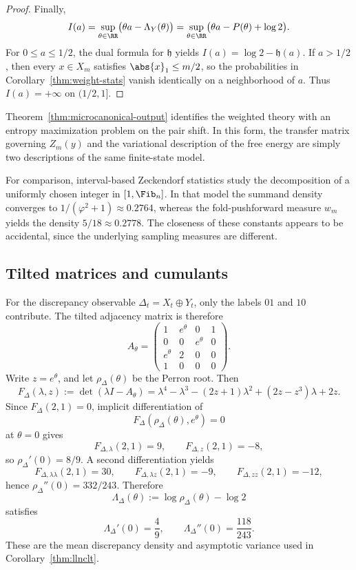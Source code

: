 \begin{proof}
Finally,
\[
I(a)=\sup_{\theta\in\RR}\bigl(\theta a-\Lambda_Y(\theta)\bigr)
=
\sup_{\theta\in\RR}\bigl(\theta a-P(\theta)+\log 2\bigr).
\]
For \(0\le a\le 1/2\), the dual formula for \(\mathfrak h\) yields \(I(a)=\log 2-\mathfrak h(a)\). If \(a>1/2\), then every \(x\in X_m\) satisfies \(\abs{x}_1\le m/2\), so the probabilities in Corollary~\ref{thm:weight-stats} vanish identically on a neighborhood of \(a\). Thus \(I(a)=+\infty\) on \((1/2,1]\).
\end{proof}

Theorem~\ref{thm:microcanonical-output} identifies the weighted theory with an entropy maximization problem on the pair shift. In this form, the transfer matrix governing \(Z_m(y)\) and the variational description of the free energy are simply two descriptions of the same finite-state model.

For comparison, interval-based Zeckendorf statistics \cite{KologluKoppMillerWang2011,MillerWang2012,BowerInsoftLiMillerTosteson2015} study the decomposition of a uniformly chosen integer in \([1,\Fib_n]\). In that model the summand density converges to \(1/(\varphi^2+1)\approx 0.2764\), whereas the fold-pushforward measure \(w_m\) yields the density \(5/18\approx 0.2778\). The closeness of these constants appears to be accidental, since the underlying sampling measures are different.


\subsection{Tilted matrices and cumulants}
For the discrepancy observable \(\Delta_t=X_t\oplus Y_t\), only the labels \(01\) and \(10\) contribute. The tilted adjacency matrix is therefore
\[
A_\theta=
\begin{pmatrix}
1& e^\theta &0&1\\
0&0& e^\theta &0\\
e^\theta &2&0&0\\
1&0&0&0
\end{pmatrix}.
\]
Write \(z=e^\theta\), and let \(\rho_\Delta(\theta)\) be the Perron root. Then
\[
F_\Delta(\lambda,z)
:=
\det(\lambda I-A_\theta)
=
\lambda^4-\lambda^3-(2z+1)\lambda^2+(2z-z^3)\lambda+2z.
\]
Since \(F_\Delta(2,1)=0\), implicit differentiation of
\[
F_\Delta(\rho_\Delta(\theta),e^\theta)=0
\]
at \(\theta=0\) gives
\[
F_{\Delta,\lambda}(2,1)=9,\qquad
F_{\Delta,z}(2,1)=-8,
\]
so \(\rho_\Delta'(0)=8/9\). A second differentiation yields
\[
F_{\Delta,\lambda\lambda}(2,1)=30,\qquad
F_{\Delta,\lambda z}(2,1)=-9,\qquad
F_{\Delta,zz}(2,1)=-12,
\]
hence \(\rho_\Delta''(0)=332/243\). Therefore
\[
\Lambda_\Delta(\theta):=\log \rho_\Delta(\theta)-\log 2
\]
satisfies
\[
\Lambda_\Delta'(0)=\frac49,
\qquad
\Lambda_\Delta''(0)=\frac{118}{243}.
\]
These are the mean discrepancy density and asymptotic variance used in Corollary~\ref{thm:llnclt}.

